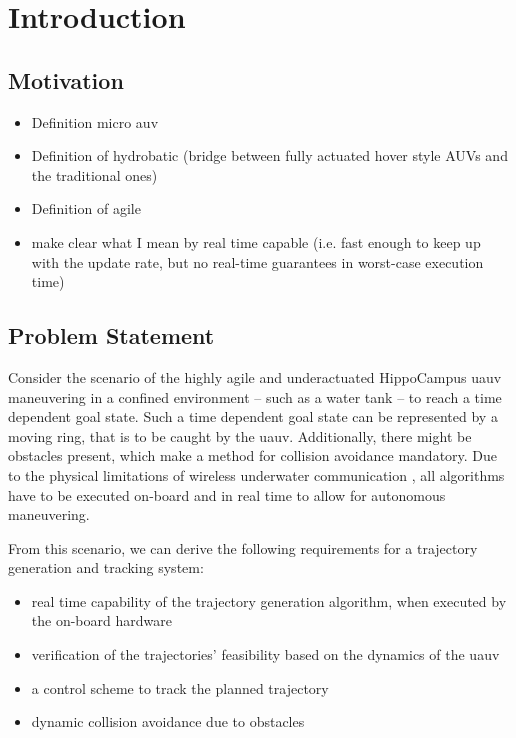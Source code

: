 \chapter{Introduction}\label{chap:introduction}

\section{Motivation}
\begin{itemize}
    \color{red}
    \item Definition micro auv \cite{micro-auv}
    \item Definition of hydrobatic \cite{hydrobatic} (bridge between fully actuated hover style AUVs and the traditional ones)
    \item Definition of agile \cite{duecker-phd}
    \item make clear what I mean by real time capable (i.e. fast enough to keep up with the update rate, but no real-time guarantees in worst-case execution time)
\end{itemize}











\section{Problem Statement}
Consider the scenario of the highly agile and underactuated HippoCampus \ac{uauv} maneuvering in a confined environment -- such as a water tank -- to reach a time dependent goal state.
Such a time dependent goal state can be represented by a moving ring, that is to be caught by the \ac{uauv}.
Additionally, there might be obstacles present, which make a method for collision avoidance mandatory.
Due to the physical limitations of wireless underwater communication \cite{Bettale08p1,GeistEtAl16}, all algorithms have to be executed on-board and in real time to allow for autonomous maneuvering.

From this scenario, we can derive the following requirements for a trajectory generation and tracking system:

\begin{itemize}
    \item real time capability of the trajectory generation algorithm, when executed by the on-board hardware
    \item verification of the trajectories' feasibility based on the dynamics of the \ac{uauv}
    \item a control scheme to track the planned trajectory
    \item dynamic collision avoidance due to obstacles
\end{itemize}

